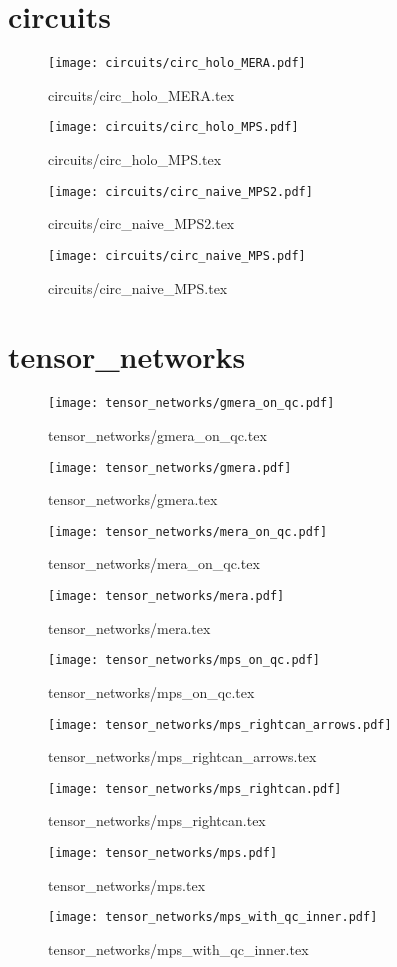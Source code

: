 \documentclass{article}
\begin{document}
	\section{circuits}
		\begin{figure}
		\texttt{[image: circuits/circ\_holo\_MERA.pdf]}
		\caption{circuits/circ\_holo\_MERA.tex}
		\end{figure}
		\begin{figure}
		\texttt{[image: circuits/circ\_holo\_MPS.pdf]}
		\caption{circuits/circ\_holo\_MPS.tex}
		\end{figure}
		\begin{figure}
		\texttt{[image: circuits/circ\_naive\_MPS2.pdf]}
		\caption{circuits/circ\_naive\_MPS2.tex}
		\end{figure}
		\begin{figure}
		\texttt{[image: circuits/circ\_naive\_MPS.pdf]}
		\caption{circuits/circ\_naive\_MPS.tex}
		\end{figure}
	\section{tensor\_networks}
		\begin{figure}
		\texttt{[image: tensor\_networks/gmera\_on\_qc.pdf]}
		\caption{tensor\_networks/gmera\_on\_qc.tex}
		\end{figure}
		\begin{figure}
		\texttt{[image: tensor\_networks/gmera.pdf]}
		\caption{tensor\_networks/gmera.tex}
		\end{figure}
		\begin{figure}
		\texttt{[image: tensor\_networks/mera\_on\_qc.pdf]}
		\caption{tensor\_networks/mera\_on\_qc.tex}
		\end{figure}
		\begin{figure}
		\texttt{[image: tensor\_networks/mera.pdf]}
		\caption{tensor\_networks/mera.tex}
		\end{figure}
		\begin{figure}
		\texttt{[image: tensor\_networks/mps\_on\_qc.pdf]}
		\caption{tensor\_networks/mps\_on\_qc.tex}
		\end{figure}
		\begin{figure}
		\texttt{[image: tensor\_networks/mps\_rightcan\_arrows.pdf]}
		\caption{tensor\_networks/mps\_rightcan\_arrows.tex}
		\end{figure}
		\begin{figure}
		\texttt{[image: tensor\_networks/mps\_rightcan.pdf]}
		\caption{tensor\_networks/mps\_rightcan.tex}
		\end{figure}
		\begin{figure}
		\texttt{[image: tensor\_networks/mps.pdf]}
		\caption{tensor\_networks/mps.tex}
		\end{figure}
		\begin{figure}
		\texttt{[image: tensor\_networks/mps\_with\_qc\_inner.pdf]}
		\caption{tensor\_networks/mps\_with\_qc\_inner.tex}
		\end{figure}
\end{document}
